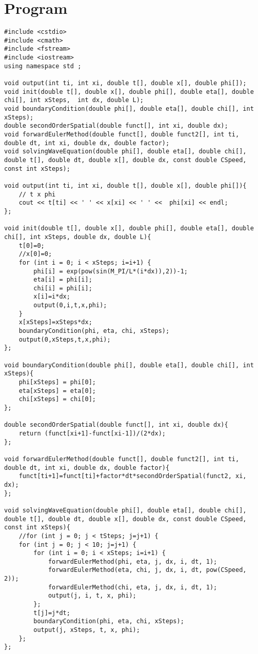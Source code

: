 \documentclass[10pt,fleqn,reqno,a4paper]{article}
\begin{document}
\section{Program}
\begin{verbatim}
#include <cstdio>
#include <cmath>
#include <fstream>
#include <iostream>
using namespace std ;

void output(int ti, int xi, double t[], double x[], double phi[]);
void init(double t[], double x[], double phi[], double eta[], double chi[], int xSteps,  int dx, double L);
void boundaryCondition(double phi[], double eta[], double chi[], int xSteps);
double secondOrderSpatial(double funct[], int xi, double dx);
void forwardEulerMethod(double funct[], double funct2[], int ti, double dt, int xi, double dx, double factor);
void solvingWaveEquation(double phi[], double eta[], double chi[], double t[], double dt, double x[], double dx, const double CSpeed, const int xSteps);

void output(int ti, int xi, double t[], double x[], double phi[]){
    // t x phi
    cout << t[ti] << ' ' << x[xi] << ' ' <<  phi[xi] << endl;
};

void init(double t[], double x[], double phi[], double eta[], double chi[], int xSteps, double dx, double L){
    t[0]=0;
    //x[0]=0;
    for (int i = 0; i < xSteps; i=i+1) {
        phi[i] = exp(pow(sin(M_PI/L*(i*dx)),2))-1;
        eta[i] = phi[i];
        chi[i] = phi[i];
        x[i]=i*dx;
        output(0,i,t,x,phi);
	}
	x[xSteps]=xSteps*dx;
    boundaryCondition(phi, eta, chi, xSteps);
    output(0,xSteps,t,x,phi);
};

void boundaryCondition(double phi[], double eta[], double chi[], int xSteps){
    phi[xSteps] = phi[0];
    eta[xSteps] = eta[0];
    chi[xSteps] = chi[0];
};

double secondOrderSpatial(double funct[], int xi, double dx){
    return (funct[xi+1]-funct[xi-1])/(2*dx);
};

void forwardEulerMethod(double funct[], double funct2[], int ti, double dt, int xi, double dx, double factor){
    funct[ti+1]=funct[ti]+factor*dt*secondOrderSpatial(funct2, xi, dx);
};

void solvingWaveEquation(double phi[], double eta[], double chi[], double t[], double dt, double x[], double dx, const double CSpeed, const int xSteps){
    //for (int j = 0; j < tSteps; j=j+1) {
    for (int j = 0; j < 10; j=j+1) {
        for (int i = 0; i < xSteps; i=i+1) {
            forwardEulerMethod(phi, eta, j, dx, i, dt, 1);
            forwardEulerMethod(eta, chi, j, dx, i, dt, pow(CSpeed, 2));
            forwardEulerMethod(chi, eta, j, dx, i, dt, 1);
            output(j, i, t, x, phi);
        };
        t[j]=j*dt;
        boundaryCondition(phi, eta, chi, xSteps);
        output(j, xSteps, t, x, phi);
    };
};


\end{verbatim}
\end{document}
